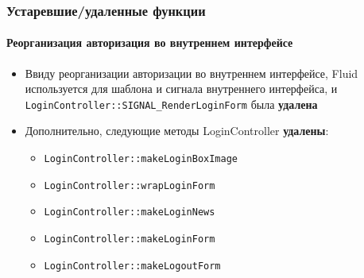 \begin{frame}[fragile]
	\frametitle{Устаревшие/удаленные функции}
	\framesubtitle{Реорганизация авторизация во внутреннем интерфейсе}

	\begin{itemize}

		\item Ввиду реорганизации авторизации во внутреннем интерфейсе, Fluid используется для
			шаблона и сигнала внутреннего интерфейса, и
			\small\texttt{LoginController::SIGNAL\_RenderLoginForm}\normalsize\space
			была \textbf{удалена}

		\item Дополнительно, следующие методы LoginController \textbf{удалены}:

			\begin{itemize}
				\item \texttt{LoginController::makeLoginBoxImage}
				\item \texttt{LoginController::wrapLoginForm}
				\item \texttt{LoginController::makeLoginNews}
				\item \texttt{LoginController::makeLoginForm}
				\item \texttt{LoginController::makeLogoutForm}
			\end{itemize}

	\end{itemize}

\end{frame}



